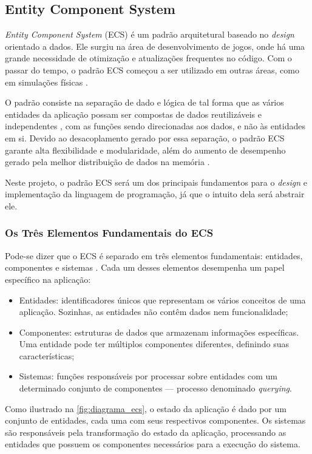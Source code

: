 \subsection{Entity Component System}

\textit{Entity Component System} (ECS) é um padrão arquitetural baseado no \textit{design} orientado a dados. Ele surgiu na área de desenvolvimento de jogos, onde há uma grande necessidade de otimização e atualizações frequentes no código. Com o passar do tempo, o padrão ECS começou a ser utilizado em outras áreas, como em simulações físicas \cite{flightdynamics}.

O padrão consiste na separação de dado e lógica de tal forma que as vários entidades da aplicação possam ser compostas de dados reutilizáveis e independentes \cite{ecsfaq}, com as funções sendo direcionadas aos dados, e não às entidades em si. Devido ao desacoplamento gerado por essa separação, o padrão ECS garante alta flexibilidade e modularidade, além do aumento de desempenho gerado pela melhor distribuição de dados na memória \cite{ecsstorageinpics}.

Neste projeto, o padrão ECS será um dos principais fundamentos para o \textit{design} e implementação da linguagem de programação, já que o intuito dela será abstrair ele.

\subsubsection{Os Três Elementos Fundamentais do ECS}

Pode-se dizer que o ECS é separado em três elementos fundamentais: entidades, componentes e sistemas \cite{ecsfaq}. Cada um desses elementos desempenha um papel específico na aplicação:

\begin{itemize}
	\item Entidades: identificadores únicos que representam os vários conceitos de uma aplicação. Sozinhas, as entidades não contêm dados nem funcionalidade;
	\item Componentes: estruturas de dados que armazenam informações específicas. Uma entidade pode ter múltiplos componentes diferentes, definindo suas características;
	\item Sistemas: funções responsáveis por processar sobre entidades com um determinado conjunto de componentes — processo denominado \textit{querying}.
\end{itemize}

Como ilustrado na \autoref{fig:diagrama_ecs}, o estado da aplicação é dado por um conjunto de entidades, cada uma com seus respectivos componentes. Os sistemas são responsáveis pela transformação do estado da aplicação, processando as entidades que possuem os componentes necessários para a execução do sistema.

